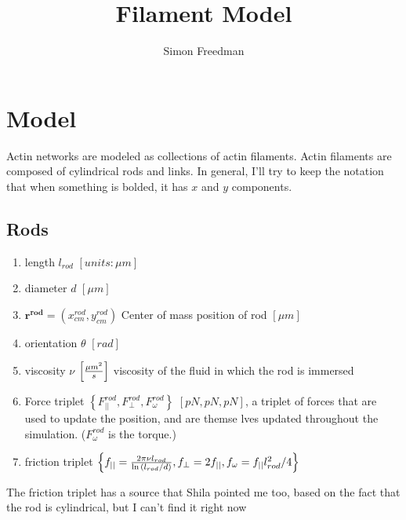 \documentclass[11pt]{article}
\begin{document}
\title{Filament Model}
\author{Simon Freedman}
\date{}
\maketitle
\section{Model} 
Actin networks are modeled as collections of actin filaments.
Actin filaments are composed of cylindrical rods and links.  
In general, I'll try to keep the notation that when something is bolded, it has $x$ and $y$ components. 
\subsection{Rods}
\begin{enumerate}
  \item length $l_{rod}$ $\left[units: \mu m\right]$
  \item diameter $d$ $\left[\mu m\right]$
  \item $\mathbf{r^{rod}} = (x^{rod}_{cm},y^{rod}_{cm})$ Center of mass position of rod $\left[\mu m\right]$
  \item orientation $\theta$ $\left[rad\right]$
  \item viscosity $\nu$ $\left[{\mu m}^2\over s\right]$ viscosity of the fluid in which the rod is immersed
  \item Force triplet $\left\{F^{rod}_{||}, F^{rod}_{\perp}, F^{rod}_{\omega}\right\}$ $[{pN, pN, pN}]$, a triplet of forces that are used
    to update the position, and are themse lves updated throughout the simulation. ($F^{rod}_{\omega}$ is the torque.) 
  \item friction triplet $\left\{f_{||} = {2\pi \nu l_{rod} \over \ln{(l_{rod}/d)}  }, f_{\perp} = 2f_{||},
    f_{\omega} = f_{||}l_{rod}^2/4\right\}$ 
\end{enumerate}
The friction triplet has a source that Shila pointed me too, based on the fact that the rod is cylindrical, but I can't
find it right now
\end{document}
